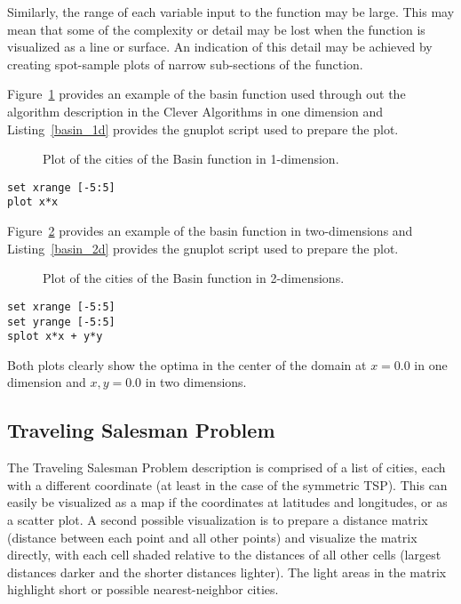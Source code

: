 \documentclass[a4paper, 11pt]{article}
\begin{document}
Similarly, the range of each variable input to the function may be large. This may mean that some of the complexity or detail may be lost when the function is visualized as a line or surface. An indication of this detail may be achieved by creating spot-sample plots of narrow sub-sections of the function. 

Figure~\ref{plot:basin1} provides an example of the basin function used through out the algorithm description in the Clever Algorithms in one dimension and Listing~\ref{basin_1d} provides the gnuplot script used to prepare the plot.

\begin{figure}[htp]

\caption{Plot of the cities of the Basin function in 1-dimension.}
\label{plot:basin1}
\end{figure}

\begin{lstlisting}[caption=Basin Function in 1-dimension, label=basin_1d]
set xrange [-5:5]
plot x*x
\end{lstlisting}

Figure~\ref{plot:basin2} provides an example of the basin function in two-dimensions and Listing~\ref{basin_2d} provides the gnuplot script used to prepare the plot.

\begin{figure}[htp]

\caption{Plot of the cities of the Basin function in 2-dimensions.}
\label{plot:basin2}
\end{figure}

\begin{lstlisting}[caption=Basin Function in 2-dimensions, label=basin_2d]
set xrange [-5:5]
set yrange [-5:5]
splot x*x + y*y
\end{lstlisting}

Both plots clearly show the optima in the center of the domain at $x=0.0$ in one dimension and $x,y=0.0$ in two dimensions.

\subsection{Traveling Salesman Problem}
The Traveling Salesman Problem description is comprised of a list of cities, each with a different coordinate (at least in the case of the symmetric TSP). This can easily be visualized as a map if the coordinates at latitudes and longitudes, or as a scatter plot.
A second possible visualization is to prepare a distance matrix (distance between each point and all other points) and visualize the matrix directly, with each cell shaded relative to the distances of all other cells (largest distances darker and the shorter distances lighter). The light areas in the matrix highlight short or possible nearest-neighbor cities.
\end{document}
